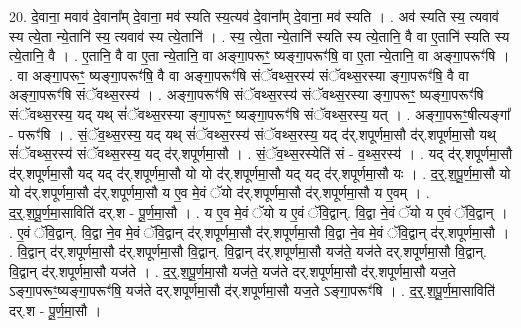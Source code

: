\documentclass[17pt]{extarticle}
\begin{document}
20. दे॒वाना॒ मवाव॑ दे॒वाना᳚म् दे॒वाना॒ मव॑ स्यति स्य॒त्यव॑ दे॒वाना᳚म् दे॒वाना॒ मव॑ स्यति । . अव॑ स्यति स्य॒ त्यवाव॑ स्य त्ये॒ता न्ये॒तानि॑ स्य॒ त्यवाव॑ स्य त्ये॒तानि॑ । . स्य॒ त्ये॒ता न्ये॒तानि॑ स्यति स्य त्ये॒तानि॒ वै वा ए॒तानि॑ स्यति स्य त्ये॒तानि॒ वै । . ए॒तानि॒ वै वा ए॒ता न्ये॒तानि॒ वा अङ्गा॒परूꣳ॒॒ ष्यङ्गा॒परूꣳ॑षि॒ वा ए॒ता न्ये॒तानि॒ वा अङ्गा॒परूꣳ॑षि । . वा अङ्गा॒परूꣳ॒॒ ष्यङ्गा॒परूꣳ॑षि॒ वै वा अङ्गा॒परूꣳ॑षि संॅवथ्स॒रस्य॑ संॅवथ्स॒रस्या ङ्गा॒परूꣳ॑षि॒ वै वा अङ्गा॒परूꣳ॑षि संॅवथ्स॒रस्य॑ । . अङ्गा॒परूꣳ॑षि संॅवथ्स॒रस्य॑ संॅवथ्स॒रस्या ङ्गा॒परूꣳ॒॒ ष्यङ्गा॒परूꣳ॑षि संॅवथ्स॒रस्य॒ यद् यथ् सं॑ॅवथ्स॒रस्या ङ्गा॒परूꣳ॒॒ ष्यङ्गा॒परूꣳ॑षि संॅवथ्स॒रस्य॒ यत् । . अङ्गा॒परूꣳ॒॒षीत्यङ्गा᳚ - परूꣳ॑षि । . सं॒ॅव॒थ्स॒रस्य॒ यद् यथ् सं॑ॅवथ्स॒रस्य॑ संॅवथ्स॒रस्य॒ यद् द॑र्.शपूर्णमा॒सौ द॑र्.शपूर्णमा॒सौ यथ् सं॑ॅवथ्स॒रस्य॑ संॅवथ्स॒रस्य॒ यद् द॑र्.शपूर्णमा॒सौ । . सं॒ॅव॒थ्स॒रस्येति॑ सं - व॒थ्स॒रस्य॑ । . यद् द॑र्.शपूर्णमा॒सौ द॑र्.शपूर्णमा॒सौ यद् यद् द॑र्.शपूर्णमा॒सौ यो यो द॑र्.शपूर्णमा॒सौ यद् यद् द॑र्.शपूर्णमा॒सौ यः । . द॒र्॒.श॒पू॒र्ण॒मा॒सौ यो यो द॑र्.शपूर्णमा॒सौ द॑र्.शपूर्णमा॒सौ य ए॒व मे॒वं ॅयो द॑र्.शपूर्णमा॒सौ द॑र्.शपूर्णमा॒सौ य ए॒वम् । . द॒र्॒.श॒पू॒र्ण॒मा॒साविति॑ दर्.श - पू॒र्ण॒मा॒सौ । . य ए॒व मे॒वं ॅयो य ए॒वं ॅवि॒द्वान्. वि॒द्वा ने॒वं ॅयो य ए॒वं ॅवि॒द्वान् । . ए॒वं ॅवि॒द्वान्. वि॒द्वा ने॒व मे॒वं ॅवि॒द्वान् द॑र्.शपूर्णमा॒सौ द॑र्.शपूर्णमा॒सौ वि॒द्वा ने॒व मे॒वं ॅवि॒द्वान् द॑र्.शपूर्णमा॒सौ । . वि॒द्वान् द॑र्.शपूर्णमा॒सौ द॑र्.शपूर्णमा॒सौ वि॒द्वान्. वि॒द्वान् द॑र्.शपूर्णमा॒सौ यज॑ते॒ यज॑ते दर्.शपूर्णमा॒सौ वि॒द्वान्. वि॒द्वान् द॑र्.शपूर्णमा॒सौ यज॑ते । . द॒र्॒.श॒पू॒र्ण॒मा॒सौ यज॑ते॒ यज॑ते दर्.शपूर्णमा॒सौ द॑र्.शपूर्णमा॒सौ यज॒ते ऽङ्गा॒परूꣳ॒॒ष्यङ्गा॒परूꣳ॑षि॒ यज॑ते दर्.शपूर्णमा॒सौ द॑र्.शपूर्णमा॒सौ यज॒ते ऽङ्गा॒परूꣳ॑षि । . द॒र्॒.श॒पू॒र्ण॒मा॒साविति॑ दर्.श - पू॒र्ण॒मा॒सौ । \newline
\end{document}
